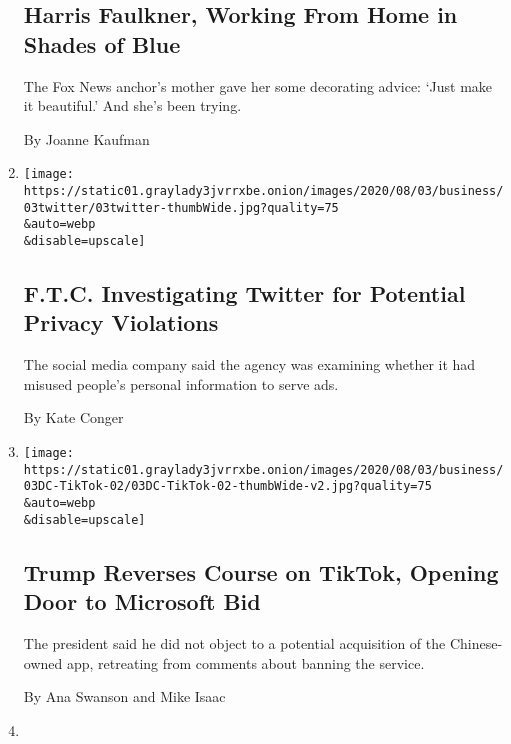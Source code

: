 \begin{enumerate}
  \hypertarget{harris-faulkner-working-from-home-in-shades-of-blue}{%
  \subsection{Harris Faulkner, Working From Home in Shades of
  Blue}\label{harris-faulkner-working-from-home-in-shades-of-blue}}

  The Fox News anchor's mother gave her some decorating advice: `Just
  make it beautiful.' And she's been trying.

  By Joanne Kaufman
\item
  \href{/2020/08/03/technology/ftc-twitter-privacy-violations.html}{}

  \texttt{[image: https://static01.graylady3jvrrxbe.onion/images/2020/08/03/business/03twitter/03twitter-thumbWide.jpg?quality=75\\\&auto=webp\\\&disable=upscale]}

  \hypertarget{ftc-investigating-twitter-for-potential-privacy-violations}{%
  \subsection{F.T.C. Investigating Twitter for Potential Privacy
  Violations}\label{ftc-investigating-twitter-for-potential-privacy-violations}}

  The social media company said the agency was examining whether it had
  misused people's personal information to serve ads.

  By Kate Conger
\item
  \href{/2020/08/03/technology/trump-tiktok-microsoft.html}{}

  \texttt{[image: https://static01.graylady3jvrrxbe.onion/images/2020/08/03/business/03DC-TikTok-02/03DC-TikTok-02-thumbWide-v2.jpg?quality=75\\\&auto=webp\\\&disable=upscale]}

  \hypertarget{trump-reverses-course-on-tiktok-opening-door-to-microsoft-bid}{%
  \subsection{Trump Reverses Course on TikTok, Opening Door to Microsoft
  Bid}\label{trump-reverses-course-on-tiktok-opening-door-to-microsoft-bid}}

  The president said he did not object to a potential acquisition of the
  Chinese-owned app, retreating from comments about banning the service.

  By Ana Swanson and Mike Isaac
\item
  \href{/2020/08/03/arts/music/taylor-swift-folklore-billboard-chart.html}{}


\end{enumerate}
